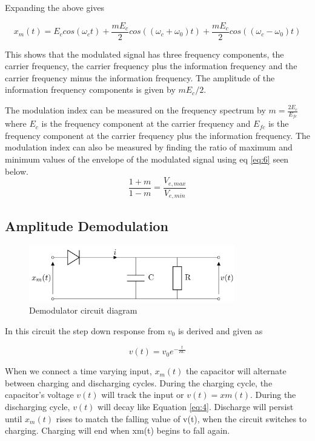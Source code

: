 \documentclass[12pt]{article}
\begin{document}
Expanding the above gives

\begin{equation}
    x_m(t) = E_c cos(\omega_c t) + \frac{m E_c}{2}cos((\omega_c + \omega_0)t) + \frac{m E_c}{2}cos((\omega_c - \omega_0)t)
    \label{eq:5}
\end{equation}

This shows that the modulated signal has three frequency components, the carrier frequency, the carrier frequency plus the information frequency and the carrier frequency minus the information frequency. The amplitude of the information frequency components is given by $mE_c/2$.

The modulation index can be measured on the frequency spectrum by $m = \frac{2E_c}{E_{fc}} $ where $E_c$ is the frequency component at the carrier frequency and $E_{fc}$ is the frequency component at the carrier frequency plus the information frequency.
The modulation index can also be measured by finding the ratio of maximum and minimum values of the envelope of the modulated signal using eq \ref{eq:6} seen below.
\begin{equation}
    \frac{1+m}{1-m} = \frac{V_{e,max}}{V_{e,min}}
    \label{eq:6}
\end{equation}

\subsection{Amplitude Demodulation}

\begin{figure}[h]
    \centering
    \includegraphics[width=0.8\textwidth]{demod_circuit.png}
    \caption{Demodulator circuit diagram}
    \label{fig:demod_circuit}
\end{figure}

In this circuit the step down response from $v_0$ is derived and given as

\begin{equation}
    v(t) = v_0 e^{-\frac{t}{RC}}
    \label{eq:7}
\end{equation}

When we connect a time varying input, $x_m(t)$ the capacitor will alternate
between charging and discharging cycles. During the charging cycle, the capacitor's voltage $v(t)$ will
track the input or $v(t) = xm(t)$. During the discharging cycle, $v(t)$ will decay like Equation \ref{eq:4}. Discharge
will persist until $x_m(t)$ rises to match the falling value of v(t), when the circuit switches to charging.
Charging will end when xm(t) begins to fall again.
\end{document}
